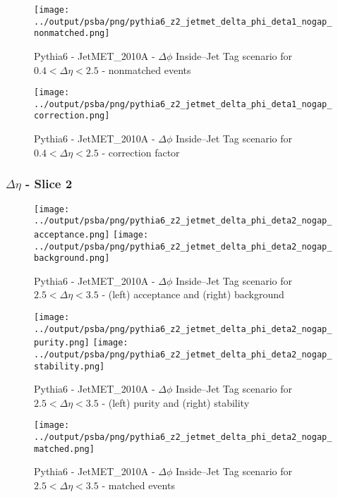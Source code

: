 \documentclass[11pt]{book}
\begin{document}
\begin{figure}[ht]
\centering
\texttt{[image: ../output/psba/png/pythia6\_z2\_jetmet\_delta\_phi\_deta1\_nogap\_nonmatched.png]}
\caption{Pythia6 - JetMET\_2010A - $\Delta\phi$ Inside--Jet Tag scenario for $0.4 < \Delta\eta < 2.5$ - nonmatched events}
\label{fig:p6_jetmet_delta_phi_deta1_nogap_nonmatched}
\end{figure}

\begin{figure}[ht]
\centering
\texttt{[image: ../output/psba/png/pythia6\_z2\_jetmet\_delta\_phi\_deta1\_nogap\_correction.png]}
\caption{Pythia6 - JetMET\_2010A - $\Delta\phi$ Inside--Jet Tag scenario for $0.4 < \Delta\eta < 2.5$ - correction factor}
\label{fig:p6_jetmet_delta_phi_deta1_nogap_correction}
\end{figure}

\clearpage
\subsubsection{$\Delta\eta$ - Slice 2}
\begin{figure}[ht]
\centering
\texttt{[image: ../output/psba/png/pythia6\_z2\_jetmet\_delta\_phi\_deta2\_nogap\_acceptance.png]}
\texttt{[image: ../output/psba/png/pythia6\_z2\_jetmet\_delta\_phi\_deta2\_nogap\_background.png]}
\caption{Pythia6 - JetMET\_2010A - $\Delta\phi$ Inside--Jet Tag scenario for $2.5 < \Delta\eta < 3.5$ - (left) acceptance and (right) background}
\label{fig:p6_jetmet_delta_phi_deta2_nogap_ab}
\end{figure}

\begin{figure}[ht]
\centering
\texttt{[image: ../output/psba/png/pythia6\_z2\_jetmet\_delta\_phi\_deta2\_nogap\_purity.png]}
\texttt{[image: ../output/psba/png/pythia6\_z2\_jetmet\_delta\_phi\_deta2\_nogap\_stability.png]}
\caption{Pythia6 - JetMET\_2010A - $\Delta\phi$ Inside--Jet Tag scenario for $2.5 < \Delta\eta < 3.5$ - (left) purity and (right) stability}
\label{fig:p6_jetmet_delta_phi_deta2_nogap_ps}
\end{figure}

\begin{figure}[ht]
\centering
\texttt{[image: ../output/psba/png/pythia6\_z2\_jetmet\_delta\_phi\_deta2\_nogap\_matched.png]}
\caption{Pythia6 - JetMET\_2010A - $\Delta\phi$ Inside--Jet Tag scenario for $2.5 < \Delta\eta < 3.5$ - matched events}
\label{fig:p6_jetmet_delta_phi_deta2_nogap_matched}
\end{figure}
\end{document}
